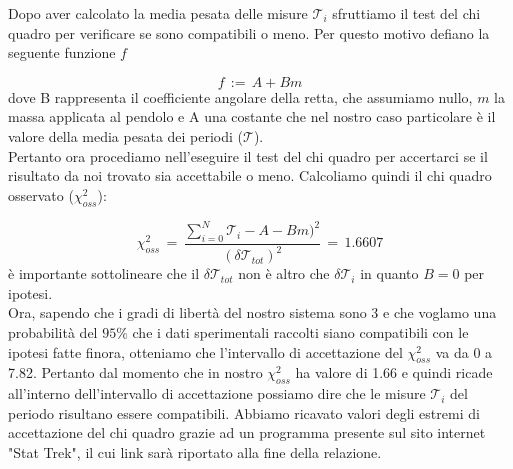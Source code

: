 Dopo aver calcolato la media pesata delle misure $\mathcal{T}_i$ sfruttiamo il test del chi quadro per verificare se sono compatibili o meno. Per questo motivo defiano la seguente funzione $f$

\begin{equation}
	f \,:=\, A + B m 
\end{equation}
%
dove B rappresenta il coefficiente angolare della retta, che assumiamo nullo, $m$ la massa applicata al pendolo e A una costante che nel nostro caso particolare è il valore della media pesata dei periodi ($\mathcal{T}$).\\
Pertanto ora procediamo nell'eseguire il test del chi quadro per accertarci se il risultato da noi trovato sia accettabile o meno. Calcoliamo quindi il chi quadro osservato ($\chi_{oss}^2$):

\begin{equation*}
	\chi_{oss}^2 \,=\, \frac{\sum_{i=0}^{N} \mathcal{T}_i - A - B m)^2}{(\delta \mathcal{T}_{tot})^2} \,=\, 1.6607
\end{equation*}
%
è importante sottolineare che il $\delta \mathcal{T}_{tot}$ non è altro che $\delta \mathcal{T}_i$ in quanto $B = 0$ per ipotesi.\\
Ora, sapendo che i gradi di libertà del nostro sistema sono 3 e che voglamo una probabilità del $95\%$ che i dati sperimentali raccolti siano compatibili con le ipotesi fatte finora, otteniamo che l'intervallo di accettazione del $\chi_{oss}^2$ va da 0 a 7.82. Pertanto dal momento che in nostro $\chi_{oss}^2$ ha valore di 1.66 e quindi ricade all'interno dell'intervallo di accettazione possiamo dire che le misure $\mathcal{T}_i$ del periodo risultano essere compatibili.
Abbiamo ricavato valori degli estremi di accettazione del chi quadro grazie ad un programma presente sul sito internet "Stat Trek", il cui link sarà riportato alla fine della relazione.